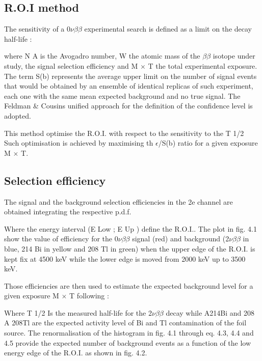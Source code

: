 \documentclass[main.tex]{subfiles}
\begin{document}
\subsection{R.O.I method}


\NI The sensitivity of a 0$\nu\beta\beta$ experimental search is defined as a limit on the decay half-life :


\bigskip


\NI where N A is the Avogadro number, W the atomic mass of the $\beta\beta$ isotope under study, the signal selection efficiency and M $\times$ T the total experimental exposure. The term S(b) represents the average upper limit on the number of signal events that would be obtained by an ensemble of identical replicas of such experiment, each one with the same mean expected background and no true signal. The Feldman \& Cousins unified approach for the definition of the confidence level is adopted.


\bigskip


\NI This method optimise the R.O.I. with respect to the sensitivity to the T 1/2
Such optimisation is achieved by maximising th $\epsilon$/S(b) ratio for a given exposure M $\times$ T.


\subsection{Selection efficiency}


\NI The signal and the background selection efficiencies in the 2e channel are obtained integrating the respective p.d.f.


\bigskip 


\NI Where the energy interval (E Low ; E Up ) define the R.O.I.. The plot in fig. 4.1 show the value of efficiency for the 0$\nu\beta\beta$ signal (red) and background (2$\nu\beta\beta$ in blue, 214 Bi in yellow and 208 Tl in green) when the upper edge of the R.O.I. is kept fix at 4500 keV while the lower edge is moved from 2000 keV up to 3500 keV.


\bigskip


\NI Those efficiencies are then used to estimate the expected background level for a given exposure M $\times$ T following :


\bigskip


\NI Where T 1/2 Is the measured half-life for the 2$\nu\beta\beta$ decay while A214Bi and 208 A 208Tl are the expected activity level of Bi and Tl contamination of the foil source. The renormalisation of the histogram in fig. 4.1 through eq. 4.3, 4.4 and 4.5 provide the expected number of background events as a function of the low energy edge of the R.O.I. as shown in fig. 4.2.
\end{document}
